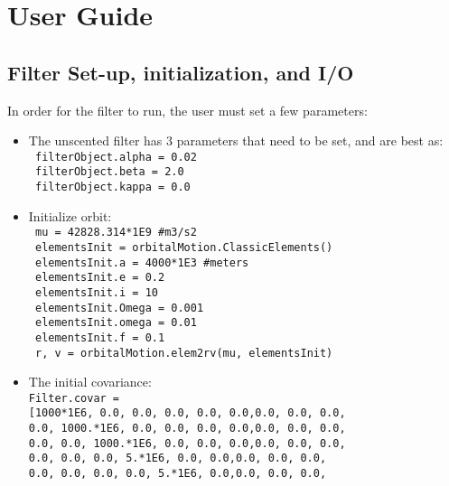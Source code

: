 
\section{User Guide}
\subsection{Filter Set-up, initialization, and I/O}

In order for the filter to run, the user must set a few parameters:

\begin{itemize}
\item The unscented filter has 3 parameters that need to be set, and are best as: \\
      \texttt{ filterObject.alpha = 0.02} \\
      \texttt{ filterObject.beta = 2.0} \\
      \texttt{ filterObject.kappa = 0.0} 
\item Initialize orbit: \\ 
\texttt{     mu = 42828.314*1E9 \#m3/s2} \\
 \texttt{    elementsInit = orbitalMotion.ClassicElements()} \\
 \texttt{    elementsInit.a = 4000*1E3 \#meters} \\
 \texttt{    elementsInit.e = 0.2} \\
 \texttt{    elementsInit.i = 10} \\
  \texttt{   elementsInit.Omega = 0.001} \\
 \texttt{    elementsInit.omega = 0.01} \\
 \texttt{    elementsInit.f = 0.1} \\
 \texttt{    r, v = orbitalMotion.elem2rv(mu, elementsInit)} 
\item The initial covariance: \\
 \texttt{Filter.covar =} \\
  \texttt{[1000*1E6, 0.0, 0.0, 0.0, 0.0, 0.0,0.0, 0.0, 0.0,\\
                              0.0, 1000.*1E6, 0.0, 0.0, 0.0, 0.0,0.0, 0.0, 0.0,\\
                              0.0, 0.0, 1000.*1E6, 0.0, 0.0, 0.0,0.0, 0.0, 0.0,\\
                              0.0, 0.0, 0.0, 5.*1E6, 0.0, 0.0,0.0, 0.0, 0.0,\\
                              0.0, 0.0, 0.0, 0.0, 5.*1E6, 0.0,0.0, 0.0, 0.0,\\
}
\end{itemize}
